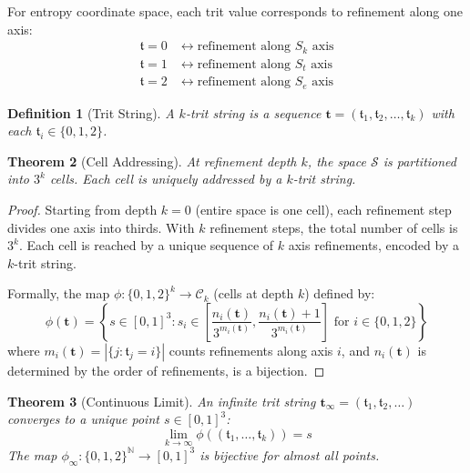 \documentclass[twocolumn,10pt,a4paper]{article}
\newtheorem{theorem}{Theorem}[section]
\newtheorem{definition}[theorem]{Definition}
\newcommand{\Sspace}{\mathcal{S}}
\newcommand{\Sk}{S_k}
\newcommand{\St}{S_t}
\newcommand{\Se}{S_e}
\newcommand{\trit}{\mathfrak{t}}
\newcommand{\N}{\mathbb{N}}
\begin{document}
For entropy coordinate space, each trit value corresponds to refinement along one axis:
\begin{align}
\trit = 0 &\leftrightarrow \text{refinement along } \Sk \text{ axis} \\
\trit = 1 &\leftrightarrow \text{refinement along } \St \text{ axis} \\
\trit = 2 &\leftrightarrow \text{refinement along } \Se \text{ axis}
\end{align}

\begin{definition}[Trit String]
A \emph{$k$-trit string} is a sequence $\mathbf{t} = (\trit_1, \trit_2, \ldots, \trit_k)$ with each $\trit_i \in \{0, 1, 2\}$.
\end{definition}

\begin{theorem}[Cell Addressing]
\label{thm:cell_address}
At refinement depth $k$, the space $\Sspace$ is partitioned into $3^k$ cells. Each cell is uniquely addressed by a $k$-trit string.
\end{theorem}

\begin{proof}
Starting from depth $k=0$ (entire space is one cell), each refinement step divides one axis into thirds. With $k$ refinement steps, the total number of cells is $3^k$. Each cell is reached by a unique sequence of $k$ axis refinements, encoded by a $k$-trit string.

Formally, the map $\phi: \{0,1,2\}^k \to \mathcal{C}_k$ (cells at depth $k$) defined by:
\begin{equation}
\phi(\mathbf{t}) = \left\{s \in [0,1]^3 : s_i \in \left[\frac{n_i(\mathbf{t})}{3^{m_i(\mathbf{t})}}, \frac{n_i(\mathbf{t})+1}{3^{m_i(\mathbf{t})}}\right] \text{ for } i \in \{0,1,2\}\right\}
\end{equation}
where $m_i(\mathbf{t}) = |\{j : \trit_j = i\}|$ counts refinements along axis $i$, and $n_i(\mathbf{t})$ is determined by the order of refinements, is a bijection.
\end{proof}

\begin{theorem}[Continuous Limit]
\label{thm:continuous}
An infinite trit string $\mathbf{t}_\infty = (\trit_1, \trit_2, \ldots)$ converges to a unique point $s \in [0,1]^3$:
\begin{equation}
\lim_{k \to \infty} \phi((\trit_1, \ldots, \trit_k)) = s
\end{equation}
The map $\phi_\infty: \{0,1,2\}^\N \to [0,1]^3$ is bijective for almost all points.
\end{theorem}
\end{document}
